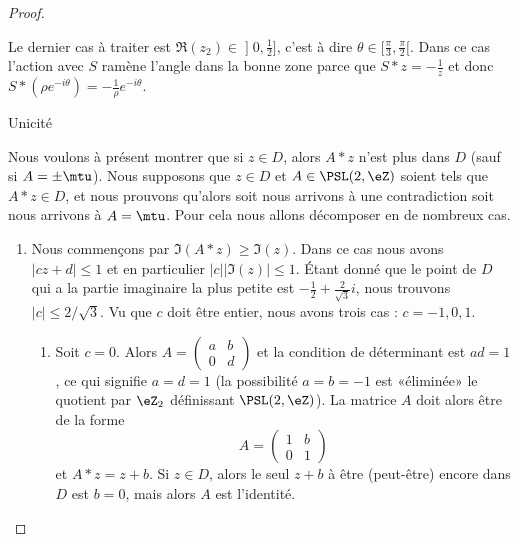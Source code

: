 \begin{proof}
\begin{subproof}
            Le dernier cas à traiter est \( \Re(z_2)\in\mathopen] 0 , \frac{ 1 }{2} \mathclose]\), c'est à dire \( \theta\in \mathopen[ \frac{ \pi }{ 3 } , \frac{ \pi }{2} [\). Dans ce cas l'action avec \( S\) ramène l'angle dans la bonne zone parce que \( S*z=-\frac{1}{ z }\) et donc \( S*(\rho e^{-i\theta})=-\frac{1}{ \rho } e^{-i\theta}\).

            \item[Unicité]

                Nous voulons à présent montrer que si \( z\in D\), alors \( A*z\) n'est plus dans \( D\) (sauf si \( A=\pm\mtu\)). Nous supposons que \( z\in D\) et \( A\in \PSL(2,\eZ)\) soient tels que \( A*z\in D\), et nous prouvons qu'alors soit nous arrivons à une contradiction soit nous arrivons à \( A=\mtu\). Pour cela nous allons décomposer en de nombreux cas.

                \begin{enumerate}
                    \item
                        Nous commençons par \( \Im(A*z)\geq \Im(z)\). Dans ce cas nous avons \( | cz+d |\leq 1\) et en particulier \( | c | |\Im(z) |\leq 1\). Étant donné que le point de \( D\) qui a la partie imaginaire la plus petite est \( -\frac{ 1 }{2}+\frac{ 2 }{ \sqrt{3} }i\), nous trouvons \( | c |\leq 2/\sqrt{3}\). Vu que \( c\) doit être entier, nous avons trois cas : \( c=-1,0,1\).
                        \begin{enumerate}
                            \item
                                Soit \( c=0\). Alors \( A=\begin{pmatrix}
                                    a    &   b    \\ 
                                    0    &   d    
                                \end{pmatrix}\) et la condition de déterminant est \( ad=1\), ce qui signifie \( a=d=1\) (la possibilité \( a=b=-1\) est «éliminée» le quotient par \( \eZ_2\) définissant \( \PSL(2,\eZ)\)). La matrice \( A\) doit alors être de la forme
                                \begin{equation}
                                    A=\begin{pmatrix}
                                        1    &   b    \\ 
                                        0    &   1    
                                    \end{pmatrix}
                                \end{equation}
                                et \( A*z=z+b\). Si \( z\in D\), alors le seul \( z+b\) à être (peut-être) encore dans \( D\) est \( b=0\), mais alors \( A\) est l'identité.


\end{enumerate}
\end{enumerate}
\end{subproof}
\end{proof}
